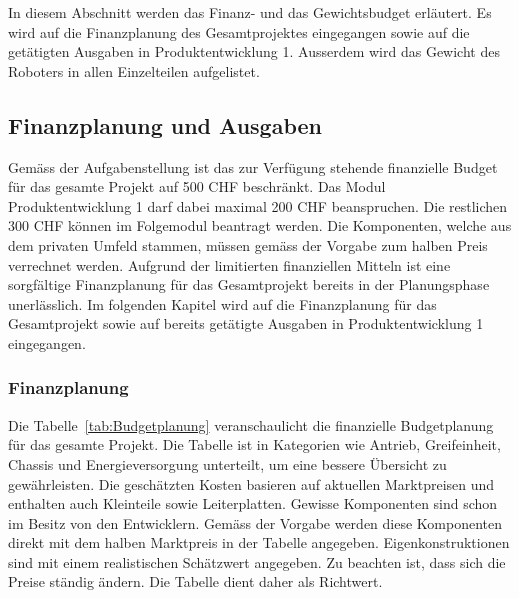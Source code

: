 \documentclass[main.tex]{subfiles} %
\begin{document}
In diesem Abschnitt werden das Finanz- und das Gewichtsbudget erläutert. Es wird auf die Finanzplanung
des Gesamtprojektes eingegangen sowie auf die getätigten Ausgaben in Produktentwicklung 1. Ausserdem wird 
das Gewicht des Roboters in allen Einzelteilen aufgelistet.


\subsection{Finanzplanung und Ausgaben}

Gemäss der Aufgabenstellung ist das zur Verfügung stehende finanzielle Budget 
für das gesamte Projekt
auf 500 CHF beschränkt. Das Modul Produktentwicklung 1 darf dabei maximal 200 CHF
beanspruchen. Die restlichen 300 CHF können im Folgemodul beantragt werden. 
Die Komponenten, welche aus dem privaten Umfeld stammen, 
müssen gemäss der Vorgabe zum halben Preis verrechnet werden. Aufgrund der limitierten 
finanziellen Mitteln ist eine sorgfältige Finanzplanung für das Gesamtprojekt bereits in
der Planungsphase unerlässlich. Im folgenden Kapitel 
wird auf die Finanzplanung für das Gesamtprojekt sowie auf bereits getätigte Ausgaben in
Produktentwicklung 1 eingegangen.

\subsubsection*{Finanzplanung}
Die Tabelle~\ref{tab:Budgetplanung} veranschaulicht die finanzielle Budgetplanung für das 
gesamte Projekt. Die Tabelle ist in Kategorien wie Antrieb, Greifeinheit, 
Chassis und Energieversorgung unterteilt, um eine bessere Übersicht zu gewährleisten. 
Die geschätzten Kosten basieren auf aktuellen Marktpreisen und enthalten auch 
Kleinteile sowie Leiterplatten. Gewisse Komponenten sind schon im Besitz von den
Entwicklern. Gemäss der Vorgabe werden diese Komponenten direkt mit dem halben
Marktpreis in der Tabelle angegeben. Eigenkonstruktionen sind mit einem realistischen 
Schätzwert angegeben. Zu beachten ist, dass sich die Preise ständig ändern. Die 
Tabelle dient daher als Richtwert.\\


\newpage
\end{document}

